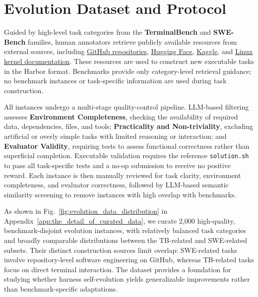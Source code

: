 \documentclass{article} %
\begin{document}









\section{Evolution Dataset and Protocol}
\label{sec:evolution_dataset_and_protocol}


Guided by high-level task categories from the \textbf{TerminalBench} and \textbf{SWE-Bench} families, human annotators retrieve publicly available resources from external sources, including
\href{https://github.com/}{GitHub repositories},
\href{https://huggingface.co/}{Hugging Face},
\href{https://www.kaggle.com/}{Kaggle},
and \href{https://docs.kernel.org/}{Linux kernel documentation}.
These resources are used to construct new executable tasks in the Harbor format.
Benchmarks provide only category-level retrieval guidance; no benchmark instances or task-specific information are used during task construction.

All instances undergo a multi-stage quality-control pipeline.
LLM-based filtering assesses \textbf{Environment Completeness}, checking the availability of required data, dependencies, files, and tools;
\textbf{Practicality and Non-triviality}, excluding artificial or overly simple tasks with limited reasoning or interaction; and
\textbf{Evaluator Validity}, requiring tests to assess functional correctness rather than superficial completion.
Executable validation requires the reference \texttt{solution.sh} to pass all task-specific tests and a no-op submission to receive no positive reward.
Each instance is then manually reviewed for task clarity, environment completeness, and evaluator correctness, followed by LLM-based semantic similarity screening to remove instances with high overlap with benchmarks.

As shown in Fig.~\ref{fig:evolution_data_distribution} in Appendix~\ref{app:the_detail_of_curated_data}, we curate 2,000 high-quality, benchmark-disjoint evolution instances, with relatively balanced task categories and broadly comparable distributions between the TB-related and SWE-related subsets.
Their distinct construction sources limit overlap: SWE-related tasks involve repository-level software engineering on GitHub, whereas TB-related tasks focus on direct terminal interaction.
The dataset provides a foundation for studying whether harness self-evolution yields generalizable improvements rather than benchmark-specific adaptations.
\end{document}

